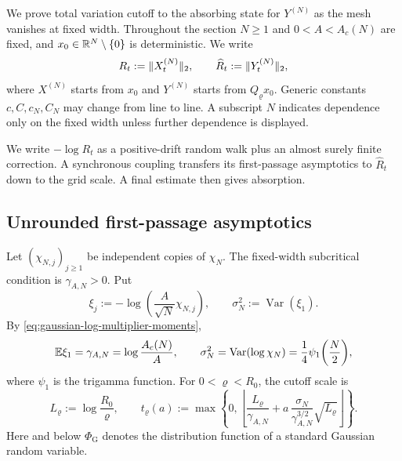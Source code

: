 \documentclass[11pt,reqno,a4paper]{article}
\newcommand{\Ee}{\E}
\DeclareMathOperator{\Var}{Var}
\begin{document}
We prove total variation cutoff to the absorbing state for $Y^{(N)}$ as the
mesh vanishes at fixed width.
Throughout the section $N\geq1$ and
$0<A<A_c(N)$ are fixed, and $x_0\in\mathbb{R}^N\setminus\{0\}$ is deterministic. We
write
\begin{equation*}
  R_t:=\lVert X_t^{(N)}\rVert_2,
  \qquad
  \widehat R_t:=\lVert Y_t^{(N)}\rVert_2,
\end{equation*}
where $X^{(N)}$ starts from $x_0$ and $Y^{(N)}$ starts from $Q_\varrho x_0$.
Generic constants $c,C,c_N,C_N$ may change from line to line. A
subscript $N$ indicates dependence only on the fixed width unless further
dependence is displayed.

We write $-\log R_t$ as a positive-drift random walk plus an almost surely
finite correction. A synchronous coupling transfers its first-passage
asymptotics to $\widehat R_t$ down to the grid scale. A final estimate then
gives absorption.

\subsection{Unrounded first-passage asymptotics}
\label{subsec:rounded-gaussian-first-passage}

Let $(\chi_{N,j})_{j\geq1}$ be independent copies of $\chi_N$. The fixed-width
subcritical condition is $\gamma_{A,N}>0$. Put
\begin{equation}\label{eq:rounded-gaussian-log-increments}
  \xi_j:=
  -\log\left(\frac A{\sqrt N}\chi_{N,j}\right),
  \qquad
  \sigma_N^2:=\Var(\xi_1).
\end{equation}
By \cref{eq:gaussian-log-multiplier-moments},
\begin{equation}\label{eq:rounded-gaussian-drift-variance-critical}
  \Ee\xi_1=\gamma_{A,N}=\log\frac{A_c(N)}A,
  \qquad
  \sigma_N^2
  =
  \Var(\log\chi_N)
  =
  \frac14\psi_1\left(\frac N2\right),
\end{equation}
where $\psi_1$ is the trigamma function. For $0<\varrho<R_0$, the cutoff scale is
\begin{equation}\label{eq:rounded-gaussian-cutoff-scale}
  L_\varrho:=\log\frac{R_0}{\varrho},
  \qquad
  t_\varrho(a)
  :=
  \max\left\{0,
    \left\lfloor
      \frac{L_\varrho}{\gamma_{A,N}}
      +
      a\,\frac{\sigma_N}{\gamma_{A,N}^{3/2}}\sqrt{L_\varrho}
    \right\rfloor
  \right\} .
\end{equation}
Here and below $\Phi_{\mathrm G}$ denotes the distribution function of a
standard Gaussian random variable.
\end{document}
